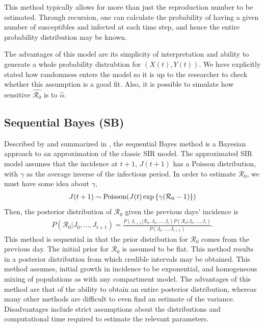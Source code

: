 \message{ !name(draft_v13.tex)}\documentclass[12pt]{article}
\newcommand{\rr}{\ensuremath{\mathcal{R}_0}}
\begin{document}
This method typically allows for more than just the reproduction number to be estimated.  Through recursion, one can calculate the probability of having a given number of susceptibles and infected at each time step, and hence the entire probability distribution may be known.

The advantages of this model are its simplicity of interpretation and ability to generate a whole probability distrubtion for $(X(t), Y(t))$.  We have explicitly stated how randomness enters the model so it is up to the researcher to check whether this assumption is a good fit.  Also, it is possible to simulate how sensitive $\hat{\rr}$ is to $\hat{\alpha}$.





\subsection{Sequential Bayes (SB)}\label{sec:seqbayes}

Described by \cite{bettencourt2008} and summarized in \cite{obadia2012r0}, the sequential Bayes method is a Bayesian approach to an approximation of the classic SIR model.  The approximated SIR model assumes that the incidence at $t+1$, $J(t+1)$ has a Poisson distribution, with $\gamma$ as the  average inverse of the infectious period. In order to estimate $\rr$, we must have some idea about $\gamma$,
\begin{align*}
J(t+1)  \sim \textnormal{Poisson}( J(t) \exp \left \{  \gamma (\rr-1)\right \})
\end{align*}
Then, the posterior distribution of $\rr$ given the previous days' incidence is
\begin{align*}
  P(\rr | J_0, \dots, J_{t+1}) = \frac{P(J_{t+1} | \rr, J_0, \dots, J_t)P(\rr| J_0, \dots, J_t)}{P(J_0, \dots, J_{t+1})}.
\end{align*}
This method is sequential in that the prior distribution for $\rr$ comes from the previous day.  The initial prior for $\rr$ is assumed to be flat.  This method results in a posterior distribution from which credible intervals may be obtained.  This method assumes, initial growth in incidence to be exponential, and homogeneous mixing of populations as with any compartment model.  The advantages of this method are that of the ability to obtain an entire posterior distribution, whereas many other methods are difficult to even find an estimate of the variance.  Disadvantages include strict assumptions about the distributions and computational time required to estimate the relevant parameters.
\end{document}
